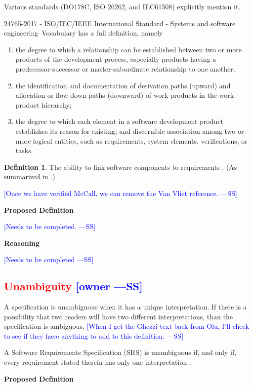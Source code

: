 \documentclass[letterpaper,cleveref]{lipics-v2019}
\newcommand{\authornote}[3]{\textcolor{#1}{[#3 ---#2]}}
\newcommand{\authornote}[3]{}
\newcommand{\wss}[1]{\authornote{blue}{SS}{#1}} %
\newcommand{\notdone}[1]{\textcolor{red}{#1}}
\theoremstyle{definition}
\newtheorem{defn}{Definition}
\begin{document}
Various standards (DO178C, ISO 26262, and IEC61508) explicitly mention it.

24765-2017 - ISO/IEC/IEEE International Standard - Systems and software
engineering--Vocabulary
has a full definition, namely
\begin{enumerate}
\item the degree to which a relationship can be established between two or more
  products of the development process, especially products having a
  predecessor-successor or master-subordinate relationship to one another;
\item the identification and documentation of derivation paths (upward) and
  allocation or flow-down paths (downward) of work products in the work product
  hierarchy;
\item the degree to which each element in a software development product
  establishes its reason for existing; and discernible association among two or
  more logical entities, such as requirements, system elements, verifications,
  or tasks.
\end{enumerate}

\begin{defn}
  The ability to link software components to requirements
  \citep{McCallEtAl1977}. (As summarized in \citet{VanVliet2000}.)
\end{defn} \wss{Once we have verified McCall, we can remove the Van Vliet
  reference.}

\noindent \textbf{Proposed Definition} 

\wss{Needs to be completed.}

\noindent \textbf{Reasoning}

\wss{Needs to be completed}

\subsection{\notdone{Unambiguity} \wss{owner}}

A specification is unambiguous when it has a unique interpretation.  If there is
a possibility that two readers will have two different interpretations, than the
specification is ambiguous.  \wss{When I get the Ghezzi text back from Olu, I'll
  check to see if they have anything to add to this definition.}

A Software Requirements Specification (SRS) is unambiguous if, and only if,
every requirement stated therein has only one interpretation \citep{IEEE1998}.

\noindent \textbf{Proposed Definition} 
\end{document}
